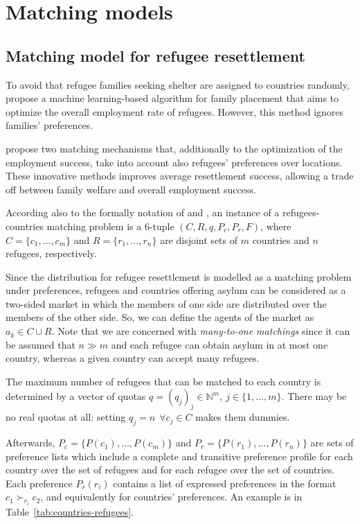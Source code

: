 \section{Matching models}\label{matching-models}%


\subsection{Matching model for refugee resettlement}\label{matching-model-for-refugee-resettlement}%

To avoid that refugee families seeking shelter are assigned to countries randomly, \citet{bansak_2018} propose a machine learning-based algorithm for family placement that aims to optimize the overall employment rate of refugees. However, this method ignores families’ preferences.

\citet{olbergml} propose two matching mechanisms that, additionally to the optimization of the employment success, take into account also refugees’ preferences over locations. These innovative methods improves average resettlement success, allowing a trade off between family welfare and overall employment success.

According also to the formally notation of \citet{salles} and \citet{delacretaz_2020}, an instance of a refugees-countries matching problem is a 6-tuple \((C, R, q, P_c, P_r, F)\), where \(C = \{c_1, \dots, c_m\}\) and \(R = \{r_1, \dots, r_n\}\) are disjoint sets of \(m\) countries and \(n\) refugees, respectively.

Since the distribution for refugee resettlement is modelled as a matching problem under preferences, refugees and countries offering asylum can be considered as a two-sided market in which the members of one side are distributed over the members of the other side. So, we can define the agents of the market as \(a_k \in C \cup R\). Note that we are concerned with \textit{many-to-one matchings} since it can be assumed that \(n \gg m\) and each refugee can obtain asylum in at most one country, whereas a given country can accept many refugees.

The maximum number of refugees that can be matched to each country is determined by a vector of quotas \(q = (q_j)_j \in \mathbb{N}^m,\ j \in \{1, \dots, m\}\). There may be no real quotas at all: setting \(q_j = n\ \ \forall c_j \in C\) makes them dummies.

Afterwards, \(P_c = \{P(c_1), \dots, P(c_m)\}\) and \(P_r =\{P(r_1), \dots, P(r_n)\}\) are sets of preference lists which include a complete and transitive preference profile for each country over the set of refugees and for each refugee over the set of countries. Each preference \(P_r(r_i)\) contains a list of expressed preferences in the format \(c_1 \succ_{r_i} c_2\), and equivalently for countries' preferences. An example is in Table~\ref{tab:countries-refugees}.

